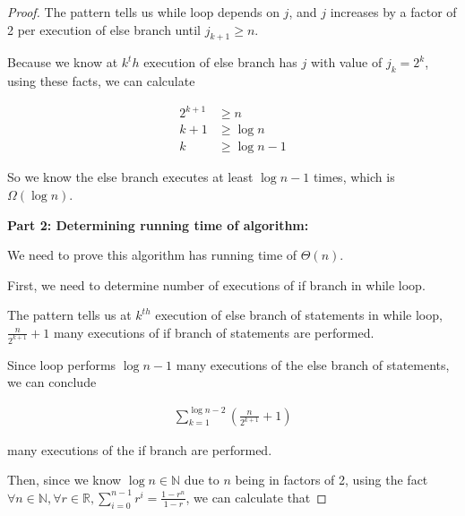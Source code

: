 \documentclass[12pt]{article}
\begin{document}
\begin{enumerate}[a.]
\begin{proof}
        \bigskip

        The pattern tells us while loop depends on $j$, and $j$ increases by a
        factor of 2 per execution of else branch until $j_{k+1} \geq n$.

        \bigskip

        Because we know at $k^th$ execution of else branch has $j$ with
        value of $j_k = 2^k$, using these facts, we can calculate

        \bigskip

        \setcounter{equation}{0}
        \begin{align}
            2^{k+1} &\geq n\\
            k + 1 &\geq \log n\\
            k &\geq \log n - 1
        \end{align}

        \bigskip

        So we know the else branch executes at least $\log n - 1$ times, which
        is $\Omega(\log n)$.

        \bigskip

        \textbf{Part 2: Determining running time of algorithm:}

        \bigskip

        We need to prove this algorithm has running time of $\Theta(n)$.

        \bigskip

        First, we need to determine number of executions of if branch in while loop.

        \bigskip

        The pattern tells us at $k^{th}$ execution of else branch of statements in while loop,
        $\frac{n}{2^{k+1}} + 1$ many executions of if branch of statements are
        performed.

        \bigskip

        Since loop performs $\log n - 1$ many executions of the else branch of
        statements, we can conclude

        \begin{align}
            \sum\limits_{k=1}^{\log n - 2} \left( \frac{n}{2^{k+1}} + 1 \right)
        \end{align}

        many executions of the if branch are performed.

        \bigskip

        Then, since we know $\log n \in \mathbb{N}$ due to $n$ being in factors of 2,
        using the fact $\forall n \in \mathbb{N}, \forall r \in \mathbb{R}, \sum\limits_{i=0}^{n-1} r^i = \frac{1 - r^n}{1 -r}$,
        we can calculate that


\end{proof}
\end{enumerate}
\end{document}
